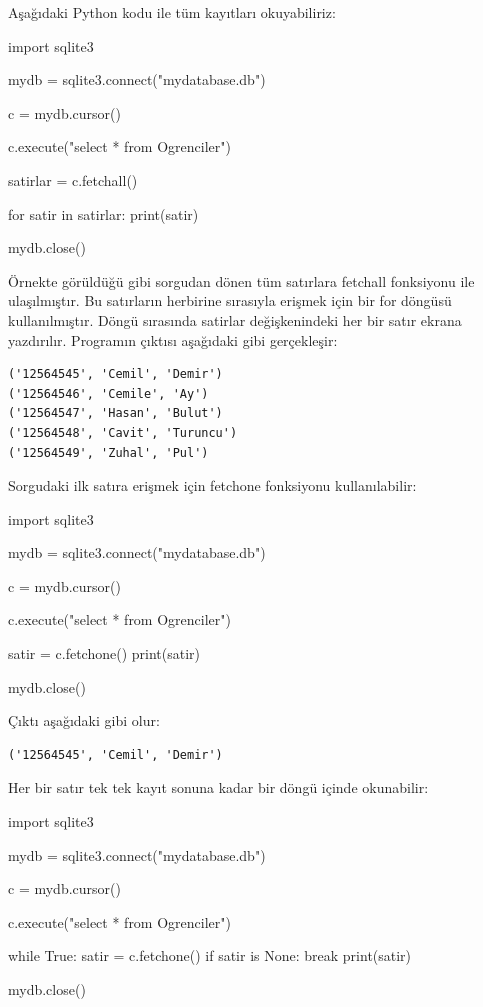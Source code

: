 \documentclass[12pt]{report}
\begin{document}
Aşağıdaki Python kodu ile tüm kayıtları okuyabiliriz:

\begin{python}
import sqlite3

mydb = sqlite3.connect("mydatabase.db")

c = mydb.cursor()

c.execute("select * from Ogrenciler")

satirlar  = c.fetchall()

for satir in satirlar:
	print(satir)

mydb.close()
\end{python}

Örnekte görüldüğü gibi sorgudan dönen tüm satırlara fetchall fonksiyonu ile ulaşılmıştır.  Bu satırların herbirine sırasıyla erişmek için bir for döngüsü kullanılmıştır. Döngü sırasında satirlar değişkenindeki her bir satır ekrana yazdırılır. Programın çıktısı aşağıdaki gibi gerçekleşir:

\begin{verbatim}
('12564545', 'Cemil', 'Demir')
('12564546', 'Cemile', 'Ay')
('12564547', 'Hasan', 'Bulut')
('12564548', 'Cavit', 'Turuncu')
('12564549', 'Zuhal', 'Pul')
\end{verbatim}

Sorgudaki ilk satıra erişmek için fetchone fonksiyonu kullanılabilir:

\begin{python}
import sqlite3

mydb = sqlite3.connect("mydatabase.db")

c = mydb.cursor()

c.execute("select * from Ogrenciler")

satir  = c.fetchone()
print(satir)

mydb.close()
\end{python}

Çıktı aşağıdaki gibi olur:

\begin{verbatim}
('12564545', 'Cemil', 'Demir')
\end{verbatim}

Her bir satır tek tek kayıt sonuna kadar bir döngü içinde okunabilir:

\begin{python}
import sqlite3
	
mydb = sqlite3.connect("mydatabase.db")
	
c = mydb.cursor()
	
c.execute("select * from Ogrenciler")
	
while True:
	satir = c.fetchone()
	if satir is None:
		break
	print(satir)
	
mydb.close()	
\end{python}
	
\end{document}
